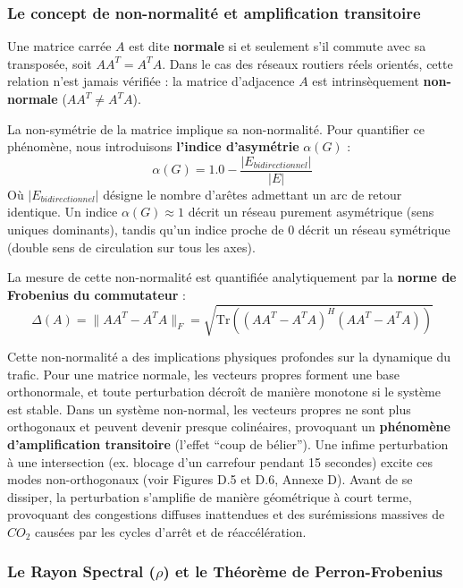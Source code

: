 \documentclass[10pt, a4paper]{article}
\begin{document}
\subsubsection{Le concept de non-normalité et amplification
transitoire}\label{le-concept-de-non-normalituxe9-et-amplification-transitoire}

Une matrice carrée \(A\) est dite \textbf{normale} si et seulement s'il
commute avec sa transposée, soit \(A A^T = A^T A\). Dans le cas des
réseaux routiers réels orientés, cette relation n'est jamais vérifiée :
la matrice d'adjacence \(A\) est intrinsèquement \textbf{non-normale}
(\(A A^T \neq A^T A\)).

La non-symétrie de la matrice implique sa non-normalité. Pour quantifier
ce phénomène, nous introduisons \textbf{l'indice d'asymétrie}
\(\alpha(G)\) : \[\alpha(G) = 1.0 - \frac{|E_{bidirectionnel}|}{|E|}\]
Où \(|E_{bidirectionnel}|\) désigne le nombre d'arêtes admettant un arc
de retour identique. Un indice \(\alpha(G) \approx 1\) décrit un réseau
purement asymétrique (sens uniques dominants), tandis qu'un indice
proche de 0 décrit un réseau symétrique (double sens de circulation sur
tous les axes).

La mesure de cette non-normalité est quantifiée analytiquement par la
\textbf{norme de Frobenius du commutateur} :
\[\Delta(A) = \| A A^T - A^T A \|_F = \sqrt{\text{Tr}\left( (A A^T - A^T A)^H (A A^T - A^T A) \right)}\]

Cette non-normalité a des implications physiques profondes sur la
dynamique du trafic. Pour une matrice normale, les vecteurs propres
forment une base orthonormale, et toute perturbation décroît de manière
monotone si le système est stable. Dans un système non-normal, les
vecteurs propres ne sont plus orthogonaux et peuvent devenir presque
colinéaires, provoquant un \textbf{phénomène d'amplification
transitoire} (l'effet ``coup de bélier''). Une infime perturbation à une
intersection (ex. blocage d'un carrefour pendant 15 secondes) excite ces
modes non-orthogonaux (voir Figures D.5 et D.6, Annexe D). Avant de se
dissiper, la perturbation s'amplifie de manière géométrique à court
terme, provoquant des congestions diffuses inattendues et des
surémissions massives de \(CO_2\) causées par les cycles d'arrêt et de
réaccélération.

\subsubsection{\texorpdfstring{Le Rayon Spectral (\(\rho\)) et le
Théorème de
Perron-Frobenius}{Le Rayon Spectral (\textbackslash rho) et le Théorème de Perron-Frobenius}}\label{le-rayon-spectral-rho-et-le-thuxe9oruxe8me-de-perron-frobenius}
\end{document}
